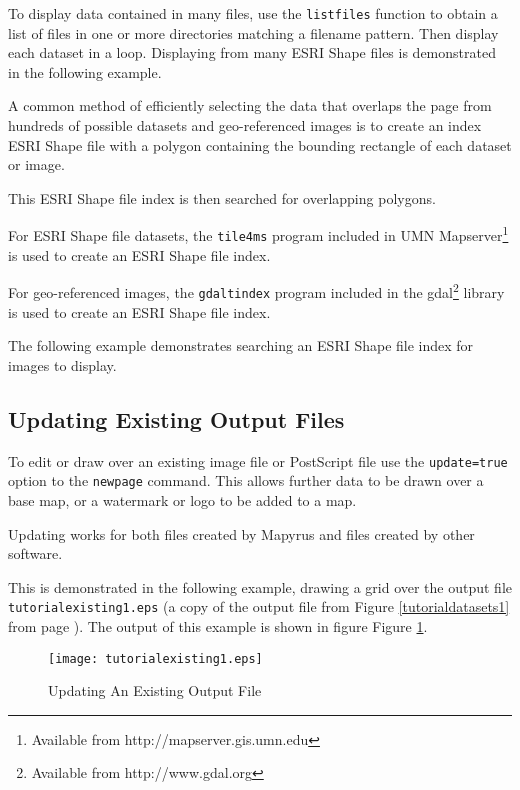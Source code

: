 To display data contained in many files, use the \texttt{listfiles}
function to obtain a list of files in one or more directories matching
a filename pattern.  Then display each dataset in a loop.
Displaying from many ESRI Shape files is demonstrated in the following
example.



A common method of efficiently selecting the data that overlaps the page from
hundreds of possible datasets and geo-referenced images is to create an index
ESRI Shape file with a polygon containing the bounding rectangle of each
dataset or image.

This ESRI Shape file index is then searched for overlapping polygons.

For ESRI Shape file datasets, the \texttt{tile4ms} program included in 
UMN Mapserver\footnote{Available from http://mapserver.gis.umn.edu} is used
to create an ESRI Shape file index.

For geo-referenced images, the
\texttt{gdaltindex} program included in the
gdal\footnote{Available from http://www.gdal.org}
library is used to create an ESRI Shape file index.

The following example demonstrates searching an ESRI Shape file index
for images to display.



\subsection{Updating Existing Output Files}

To edit or draw over an existing image file or PostScript file use
the \texttt{update=true} option to the \texttt{newpage} command.
This allows further data to be drawn over a base map, or a watermark
or logo to be added to a map.

Updating works for both files created by Mapyrus and files created
by other software.

This is demonstrated in the following example, drawing a grid over
the output file \texttt{tutorialexisting1.eps} (a copy of the output file
from Figure \ref{tutorialdatasets1} from page \pageref{tutorialdatasets1}).
The output of this example is shown in figure
Figure \ref{tutorialexisting1}.



\begin{figure}[htb]
\texttt{[image: tutorialexisting1.eps]}
\caption{Updating An Existing Output File}
\label{tutorialexisting1}
\end{figure}

